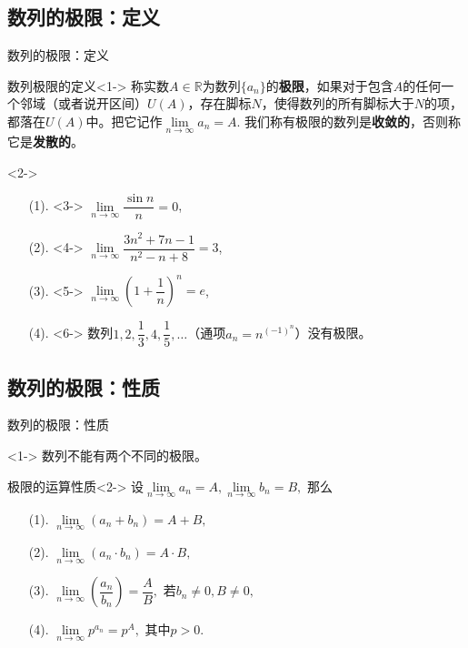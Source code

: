 
\subsection{数列的极限：定义}


\begin{frame}{数列的极限：定义}

\begin{block}{数列极限的定义}<1->
称实数$A\in\mathbb{R}$为数列$\{a_n\}$的{\bfseries 极限}，如果对于包含$A$的任何一个邻域（或者说开区间）$U(A)$，存在脚标$N$，使得数列的所有脚标大于$N$的项，都落在$U(A)$中。把它记作$\lim\limits_{n\to\infty}a_n = A.$\newline
我们称有极限的数列是{\bfseries 收敛的}，否则称它是{\bfseries 发散的}。
\end{block}

\begin{eg}<2->
\begin{itemize}
\item[(1).]<3-> $\lim\limits_{n\to\infty} \dfrac{\sin n}{n} = 0$,
\item[(2).]<4-> $\lim\limits_{n\to\infty} \dfrac{3n^2+7n-1}{n^2-n+8} = 3$,
\item[(3).]<5-> $\lim\limits_{n\to\infty} (1+\dfrac{1}{n})^n = e$,
\item[(4).]<6-> 数列$1,2,\dfrac{1}{3},4,\dfrac{1}{5},\ldots$（通项$a_n = n^{(-1)^n}$）没有极限。
\end{itemize}
\end{eg}

\end{frame}


\subsection{数列的极限：性质}

\begin{frame}{数列的极限：性质}

\begin{thm}[极限唯一性]<1->
数列不能有两个不同的极限。
\end{thm}

\begin{block}{极限的运算性质}<2->
设$\lim\limits_{n\to\infty}a_n = A, \lim\limits_{n\to\infty}b_n = B,$ 那么
\begin{itemize}
\item[(1).] $\lim\limits_{n\to\infty}(a_n+b_n) = A+B,$
\item[(2).] $\lim\limits_{n\to\infty}(a_n\cdot b_n) = A\cdot B,$
\item[(3).] $\lim\limits_{n\to\infty}(\dfrac{a_n}{b_n}) = \dfrac{A}{B},$ 若$b_n\neq0,B\neq0,$
\item[(4).] $\lim\limits_{n\to\infty} p^{a_n} = p^A,$ 其中$p>0.$
\end{itemize}
\end{block}

\end{frame}

